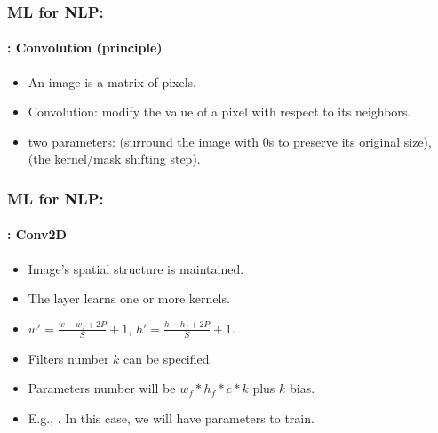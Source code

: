 \documentclass[xcolor=table]{beamer}
\begin{document}
	\begin{frame}
		\frametitle{ML for NLP: \insertsection}
		\framesubtitle{\insertsubsection: Convolution (principle)}
		
		\begin{itemize}
			\item An image is a matrix of pixels.
			\item Convolution: modify the value of a pixel with respect to its neighbors.
			\item two parameters:  (surround the image with 0s to preserve its original size),  (the kernel/mask shifting step).
		\end{itemize}
		
		\begin{center}
		\end{center}
		
	\end{frame}
	
	\begin{frame}
		\frametitle{ML for NLP: \insertsection}
		\framesubtitle{\insertsubsection: Conv2D}
		
		\begin{minipage}{0.60\textwidth} 
			\begin{itemize}
				\item Image's spatial structure is maintained.
				\item The layer learns one or more kernels.
				\item $ w' = \frac{w - w_f + 2P}{S} + 1$,  $ h' = \frac{h - h_f + 2P}{S} + 1$.
				\item Filters number $k$ can be specified.
				\item Parameters number will be $w_f * h_f * c * k$ plus $k$ bias.
				\item E.g., . In this case, we will have  parameters to train.
			\end{itemize}
		\end{minipage}
		\begin{minipage}{0.39\textwidth}
			\hgraphpage[\textwidth]{conv2d.pdf}
		\end{minipage}
		
	\end{frame}
\end{document}
